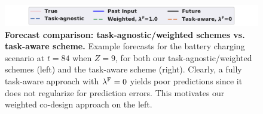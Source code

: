 \begin{figure}[ht]
\vskip 0.2in
\begin{center}
\includegraphics[width=0.8\columnwidth]{figures/forecast_legend.pdf}

\caption{\textbf{Forecast comparison: task-agnostic/weighted schemes vs. task-aware scheme.}  Example forecasts for the battery charging scenario at $t=84$ when $Z=9$, for both our task-agnostic/weighted schemes (left) and the task-aware scheme (right). Clearly, a fully task-aware approach with $\lambda^{\mathrm{F}} = 0$ yields poor predictions since it does not regularize for prediction errors. This motivates our weighted co-design approach on the left.}
\label{fig:forecasts_comparison}
\end{center}
\vskip -0.2in
\end{figure}


